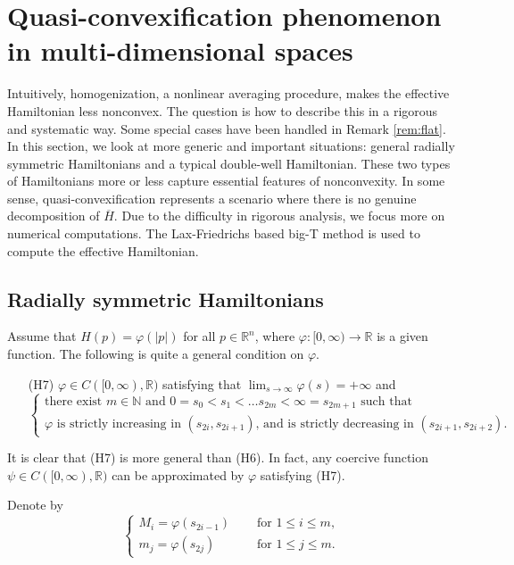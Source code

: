 \documentclass[12pt,reqno]{amsart}
\theoremstyle{plain}
\theoremstyle{remark}
\numberwithin{equation}{section}
\newcommand{\N}{\mathbb{N}}
\newcommand{\R}{\mathbb{R}}
\newcommand{\ol}{\overline}
\begin{document}
\section{Quasi-convexification phenomenon in multi-dimensional spaces} \label{sec:quasi}



Intuitively,  homogenization, a nonlinear averaging procedure, makes the effective Hamiltonian less nonconvex. 
The question is how to describe this in a rigorous and systematic way. 
Some special cases have been handled  in Remark  \ref{rem:flat}. In this section,  we look at more generic and  important situations: general radially symmetric Hamiltonians and a typical double-well Hamiltonian.  These two types of Hamiltonians more or less capture essential features of nonconvexity.    In some sense,  quasi-convexification represents  a scenario where there is no genuine decomposition of $\ol H$.  
Due to the difficulty in rigorous analysis,  we focus more on numerical computations.  
The Lax-Friedrichs based big-T method is used  to compute the effective Hamiltonian.

 \subsection{Radially symmetric Hamiltonians} 
Assume that $H(p)=\varphi(|p|)$ for all $p\in \R^n$, where $\varphi:[0,\infty)\to  \mathbb{R}$ is a given function.
 The following is quite a general condition on $\varphi$.
 
 \begin{itemize}
\item[(H7)] $\varphi \in C([0,\infty),\R)$ satisfying that $\lim_{s\to \infty} \varphi(s)=+\infty$ and 
\[
\begin{cases}
\text{there exist $m \in \N$ and $0=s_0 <s_1 < \ldots s_{2m}<\infty=s_{2m+1}$ such that}\\
\text{$\varphi$ is strictly increasing in $(s_{2i},s_{2i+1})$, and is strictly decreasing in $(s_{2i+1},s_{2i+2})$.}
\end{cases}
\]
\end{itemize}
 It is clear that (H7) is more general than (H6).  In fact,  any coercive function $\psi \in C([0,\infty),\R)$ can be approximated by $\varphi$ satisfying (H7). 

Denote by
\[
\begin{cases}
M_i=\varphi(s_{2i-1})   \quad &\text{ for } 1\leq i \leq  m,\\
m_j=\varphi(s_{2j})  \quad &\text{ for } 1 \leq j \leq m.
\end{cases}
\]
\end{document}
